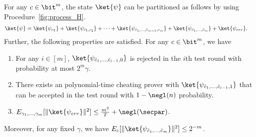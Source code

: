 \begin{lemma}\label{lem:partition_further}
For any $c\in \bit^m$, the state $\ket{\psi}$ can be partitioned as follows by using Procedure~\ref{fig:process_H}. 
\begin{align*}
    & \ket{\psi} = \ket{\psi_{c_1}} + \ket{\psi_{\bar{c}_1,c_2}} + \cdots +\ket{\psi_{\bar{c}_1,\dots,\bar{c}_{m-1},c_m}} + \ket{\psi_{\bar{c}_1,\dots,\bar{c}_m}}+ \ket{\psi_{err}}.
\end{align*}
Further, the following properties are satisfied. 
For any $c\in\bit^{m}$, we have 
\begin{enumerate}
    \item For any $i\in [m]$,
    $\ket{\psi_{\bar{c}_1,\dots,\bar{c}_{i-1},0}}$ is rejected in the $i$th test round with probability at most $2^m\gamma$.
    
    \item There exists an polynomial-time cheating prover with $\ket{\psi_{\bar{c}_1,\dots,\bar{c}_{i-1},1}}$ that can be accepted in the test round with $1-\negl(n)$ probability. 
\item $E_{\gamma_1,...,\gamma_m}[\|\ket{\psi_{err}}\|^2]\leq \frac{m^2}{T}+\negl(\secpar)$.
\end{enumerate}
 Moreover, for any fixed $\gamma$, we have $E_c[\|\ket{\psi_{\bar{c}_1,\dots,\bar{c}_m}}\|^2] \leq 2^{-m}$.
\end{lemma}

